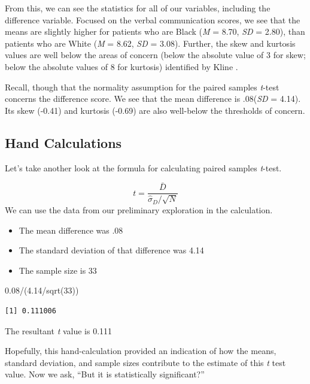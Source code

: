 \documentclass[
  11pt,
]{book}
\newenvironment{Shaded}{\begin{snugshade}}{\end{snugshade}}
\newcommand{\DecValTok}[1]{\textcolor[rgb]{0.00,0.00,0.81}{#1}}
\newcommand{\FloatTok}[1]{\textcolor[rgb]{0.00,0.00,0.81}{#1}}
\newcommand{\FunctionTok}[1]{\textcolor[rgb]{0.00,0.00,0.00}{#1}}
\newcommand{\NormalTok}[1]{#1}
\newcommand{\SpecialCharTok}[1]{\textcolor[rgb]{0.00,0.00,0.00}{#1}}
\providecommand{\tightlist}{%
  \setlength{\itemsep}{0pt}\setlength{\parskip}{0pt}}
\begin{document}
From this, we can see the statistics for all of our variables, including the difference variable. Focused on the verbal communication scores, we see that the means are slightly higher for patients who are Black (\emph{M} = 8.70, \emph{SD} = 2.80), than patients who are White (\emph{M} = 8.62, \emph{SD} = 3.08). Further, the skew and kurtosis values are well below the areas of concern (below the absolute value of 3 for skew; below the absolute values of 8 for kurtosis) identified by Kline \citeyearpar{kline_principles_2016}.

Recall, though that the normality assumption for the paired samples \emph{t}-test concerns the difference score. We see that the mean difference is .08(\emph{SD} = 4.14). Its skew (-0.41) and kurtosis (-0.69) are also well-below the thresholds of concern.

\hypertarget{hand-calculations-2}{%
\subsection{Hand Calculations}\label{hand-calculations-2}}

Let's take another look at the formula for calculating paired samples \emph{t}-test.

\[t = \frac{\bar{D}}{\hat\sigma_D / \sqrt{N}}\]
We can use the data from our preliminary exploration in the calculation.

\begin{itemize}
\tightlist
\item
  The mean difference was .08
\item
  The standard deviation of that difference was 4.14
\item
  The sample size is 33
\end{itemize}

\begin{Shaded}
\begin{Highlighting}[]
\FloatTok{0.08}\SpecialCharTok{/}\NormalTok{(}\FloatTok{4.14}\SpecialCharTok{/}\FunctionTok{sqrt}\NormalTok{(}\DecValTok{33}\NormalTok{))}
\end{Highlighting}
\end{Shaded}

\begin{verbatim}
[1] 0.111006
\end{verbatim}

The resultant \emph{t} value is 0.111

Hopefully, this hand-calculation provided an indication of how the means, standard deviation, and sample sizes contribute to the estimate of this \emph{t} test value. Now we ask, ``But it is statistically significant?''
\end{document}
